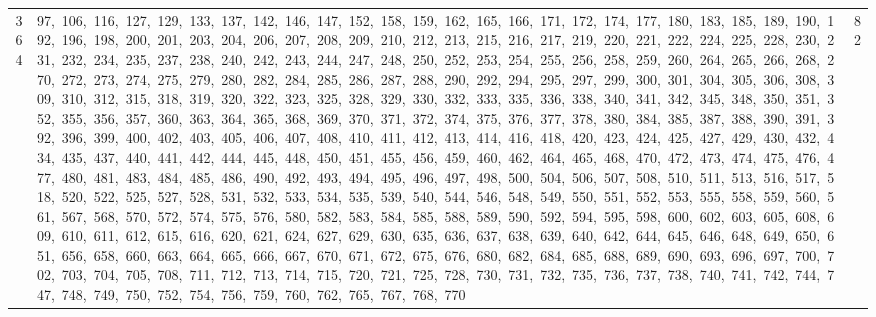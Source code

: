 \begin{longtable}{c|p{}|r}
364 & 97,\ 106,\ 116,\ 127,\ 129,\ 133,\ 137,\ 142,\ 146,\ 147,\ 152,\ 158,\ 159,\ 162,\ 165,\ 166,\ 171,\ 172,\ 174,\ 177,\ 180,\ 183,\ 185,\ 189,\ 190,\ 192,\ 196,\ 198,\ 200,\ 201,\ 203,\ 204,\ 206,\ 207,\ 208,\ 209,\ 210,\ 212,\ 213,\ 215,\ 216,\ 217,\ 219,\ 220,\ 221,\ 222,\ 224,\ 225,\ 228,\ 230,\ 231,\ 232,\ 234,\ 235,\ 237,\ 238,\ 240,\ 242,\ 243,\ 244,\ 247,\ 248,\ 250,\ 252,\ 253,\ 254,\ 255,\ 256,\ 258,\ 259,\ 260,\ 264,\ 265,\ 266,\ 268,\ 270,\ 272,\ 273,\ 274,\ 275,\ 279,\ 280,\ 282,\ 284,\ 285,\ 286,\ 287,\ 288,\ 290,\ 292,\ 294,\ 295,\ 297,\ 299,\ 300,\ 301,\ 304,\ 305,\ 306,\ 308,\ 309,\ 310,\ 312,\ 315,\ 318,\ 319,\ 320,\ 322,\ 323,\ 325,\ 328,\ 329,\ 330,\ 332,\ 333,\ 335,\ 336,\ 338,\ 340,\ 341,\ 342,\ 345,\ 348,\ 350,\ 351,\ 352,\ 355,\ 356,\ 357,\ 360,\ 363,\ 364,\ 365,\ 368,\ 369,\ 370,\ 371,\ 372,\ 374,\ 375,\ 376,\ 377,\ 378,\ 380,\ 384,\ 385,\ 387,\ 388,\ 390,\ 391,\ 392,\ 396,\ 399,\ 400,\ 402,\ 403,\ 405,\ 406,\ 407,\ 408,\ 410,\ 411,\ 412,\ 413,\ 414,\ 416,\ 418,\ 420,\ 423,\ 424,\ 425,\ 427,\ 429,\ 430,\ 432,\ 434,\ 435,\ 437,\ 440,\ 441,\ 442,\ 444,\ 445,\ 448,\ 450,\ 451,\ 455,\ 456,\ 459,\ 460,\ 462,\ 464,\ 465,\ 468,\ 470,\ 472,\ 473,\ 474,\ 475,\ 476,\ 477,\ 480,\ 481,\ 483,\ 484,\ 485,\ 486,\ 490,\ 492,\ 493,\ 494,\ 495,\ 496,\ 497,\ 498,\ 500,\ 504,\ 506,\ 507,\ 508,\ 510,\ 511,\ 513,\ 516,\ 517,\ 518,\ 520,\ 522,\ 525,\ 527,\ 528,\ 531,\ 532,\ 533,\ 534,\ 535,\ 539,\ 540,\ 544,\ 546,\ 548,\ 549,\ 550,\ 551,\ 552,\ 553,\ 555,\ 558,\ 559,\ 560,\ 561,\ 567,\ 568,\ 570,\ 572,\ 574,\ 575,\ 576,\ 580,\ 582,\ 583,\ 584,\ 585,\ 588,\ 589,\ 590,\ 592,\ 594,\ 595,\ 598,\ 600,\ 602,\ 603,\ 605,\ 608,\ 609,\ 610,\ 611,\ 612,\ 615,\ 616,\ 620,\ 621,\ 624,\ 627,\ 629,\ 630,\ 635,\ 636,\ 637,\ 638,\ 639,\ 640,\ 642,\ 644,\ 645,\ 646,\ 648,\ 649,\ 650,\ 651,\ 656,\ 658,\ 660,\ 663,\ 664,\ 665,\ 666,\ 667,\ 670,\ 671,\ 672,\ 675,\ 676,\ 680,\ 682,\ 684,\ 685,\ 688,\ 689,\ 690,\ 693,\ 696,\ 697,\ 700,\ 702,\ 703,\ 704,\ 705,\ 708,\ 711,\ 712,\ 713,\ 714,\ 715,\ 720,\ 721,\ 725,\ 728,\ 730,\ 731,\ 732,\ 735,\ 736,\ 737,\ 738,\ 740,\ 741,\ 742,\ 744,\ 747,\ 748,\ 749,\ 750,\ 752,\ 754,\ 756,\ 759,\ 760,\ 762,\ 765,\ 767,\ 768,\ 770 & 82 \\

\end{longtable}
